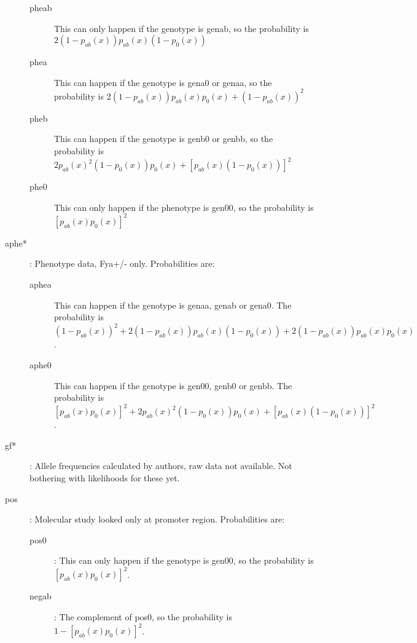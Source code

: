 \documentclass[a4paper]{article}
\begin{document}
\begin{description}
    \begin{description}
        \item[pheab] This can only happen if the genotype is genab, so the probability is $2(1-p_{ab}(x))p_{ab}(x)(1-p_0(x))$
        \item[phea] This can happen if the genotype is gena0 or genaa, so the probability is $2(1-p_{ab}(x))p_{ab}(x)p_0(x)+(1-p_{ab}(x))^2$
        \item[pheb] This can happen if the genotype is genb0 or genbb, so the probability is $2p_{ab}(x)^2(1-p_0(x))p_0(x)+[p_{ab}(x)(1-p_0(x))]^2$
        \item[phe0] This can only happen if the phenotype is gen00, so the probability is $[p_{ab}(x)p_0(x)]^2$
    \end{description}
    \item[aphe*]: Phenotype data, Fya+/- only. Probabilities are:
    \begin{description}
        \item[aphea] This can happen if the genotype is genaa, genab or gena0. The probability is $(1-p_{ab}(x))^2+2(1-p_{ab}(x))p_{ab}(x)(1-p_0(x))+2(1-p_{ab}(x))p_{ab}(x)p_0(x)$.
        \item[aphe0] This can happen if the genotype is gen00, genb0 or genbb. The probability is $[p_{ab}(x)p_0(x)]^2+2p_{ab}(x)^2(1-p_0(x))p_0(x)+[p_{ab}(x)(1-p_0(x))]^2$.
    \end{description}
    \item[gf*]: Allele frequencies calculated by authors, raw data not available. Not bothering with likelihoods for these yet.
    \item[pos]: Molecular study looked only at promoter region. Probabilities are:
    \begin{description}
        \item[pos0]: This can only happen if the genotype is gen00, so the probability is $[p_{ab}(x)p_0(x)]^2$.
        \item[negab]: The complement of pos0, so the probability is $1-[p_{ab}(x)p_0(x)]^2$.
    \end{description}
\end{description}
\end{document}
